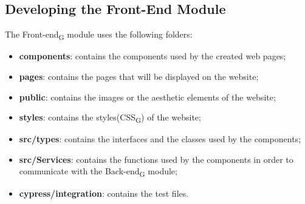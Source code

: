 \subsection{Developing the Front-End Module}
The Front-end\textsubscript{G} module uses the following folders:
\begin{itemize}
\item \textbf{components}: contains the components used by the created web pages;
\item \textbf{pages}: contains the pages that will be displayed on the website;
\item \textbf{public}: contains the images or the aesthetic elements of the website;
\item \textbf{styles}: contains the styles(CSS\textsubscript{G}) of the website;
\item \textbf{src/types}: contains the interfaces and the classes used by the components;
\item \textbf{src/Services}: contains the functions used by the components in order to communicate with the Back-end\textsubscript{G} module;
\item \textbf{cypress/integration}: contains the test files. 
\end{itemize}